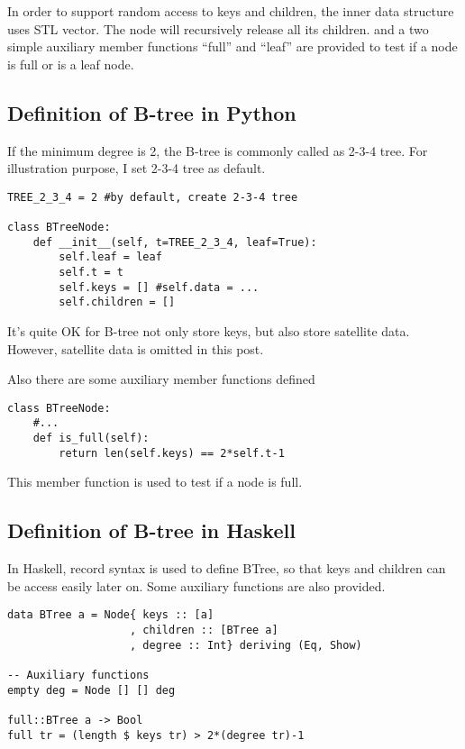 \documentclass{article}
\begin{document}
In order to support random access to keys and children, the
inner data structure uses STL vector. The node will recursively
release all its children. and a two simple auxiliary member
functions ``full'' and ``leaf'' are provided to test if a node
is full or is a leaf node.

\subsection*{Definition of B-tree in Python}

If the minimum degree is 2, the B-tree is commonly called as 2-3-4 tree.
For illustration purpose, I set 2-3-4 tree as default.

\lstset{language=Python}
\begin{lstlisting}
TREE_2_3_4 = 2 #by default, create 2-3-4 tree

class BTreeNode:
    def __init__(self, t=TREE_2_3_4, leaf=True):
        self.leaf = leaf
        self.t = t
        self.keys = [] #self.data = ...
        self.children = []
\end{lstlisting}

It's quite OK for B-tree not only store keys, but also store satellite data.
However, satellite data is omitted in this post.

Also there are some auxiliary member functions defined

\begin{lstlisting}
class BTreeNode:
    #...
    def is_full(self):
        return len(self.keys) == 2*self.t-1
\end{lstlisting}

This member function is used to test if a node is full.

\subsection*{Definition of B-tree in Haskell}
In Haskell, record syntax is used to define BTree, so that keys and children 
can be access easily later on. Some auxiliary functions are also provided.

\lstset{language=Haskell}
\begin{lstlisting}
data BTree a = Node{ keys :: [a]
                   , children :: [BTree a]
                   , degree :: Int} deriving (Eq, Show)

-- Auxiliary functions
empty deg = Node [] [] deg

full::BTree a -> Bool
full tr = (length $ keys tr) > 2*(degree tr)-1
\end{lstlisting} %
\end{document}
